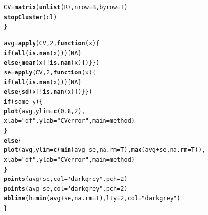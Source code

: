 \documentclass[11pt]{article}\usepackage[]{graphicx}\usepackage[]{color}
\makeatletter
\newcommand{\hlnum}[1]{\textcolor[rgb]{0.686,0.059,0.569}{#1}}%
\newcommand{\hlstr}[1]{\textcolor[rgb]{0.192,0.494,0.8}{#1}}%
\newcommand{\hlopt}[1]{\textcolor[rgb]{0,0,0}{#1}}%
\newcommand{\hlstd}[1]{\textcolor[rgb]{0.345,0.345,0.345}{#1}}%
\newcommand{\hlkwa}[1]{\textcolor[rgb]{0.161,0.373,0.58}{\textbf{#1}}}%
\newcommand{\hlkwb}[1]{\textcolor[rgb]{0.69,0.353,0.396}{#1}}%
\newcommand{\hlkwc}[1]{\textcolor[rgb]{0.333,0.667,0.333}{#1}}%
\newcommand{\hlkwd}[1]{\textcolor[rgb]{0.737,0.353,0.396}{\textbf{#1}}}%
\newenvironment{kframe}{%
 \def\at@end@of@kframe{}%
 \ifinner\ifhmode%
  \def\at@end@of@kframe{\end{minipage}}%
  \begin{minipage}{\columnwidth}%
 \fi\fi%
 \def\FrameCommand##1{\hskip\@totalleftmargin \hskip-\fboxsep
 \colorbox{shadecolor}{##1}\hskip-\fboxsep
     \hskip-\linewidth \hskip-\@totalleftmargin \hskip\columnwidth}%
 \MakeFramed {\advance\hsize-\width
   \@totalleftmargin\z@ \linewidth\hsize
   \@setminipage}}%
 {\par\unskip\endMakeFramed%
 \at@end@of@kframe}
\newenvironment{knitrout}{}{} %
\makeatother
\begin{document}
\begin{knitrout}
\begin{kframe}
\begin{alltt}
    \hlstd{CV} \hlkwb{=} \hlkwd{matrix}\hlstd{(}\hlkwd{unlist}\hlstd{(R),} \hlkwc{nrow} \hlstd{= B,} \hlkwc{byrow} \hlstd{= T)}
    \hlkwd{stopCluster}\hlstd{(cl)}
  \hlstd{\}}

  \hlstd{avg} \hlkwb{=} \hlkwd{apply}\hlstd{(CV,}\hlnum{2}\hlstd{,}\hlkwa{function}\hlstd{(}\hlkwc{x}\hlstd{)\{}
    \hlkwa{if} \hlstd{(}\hlkwd{all}\hlstd{(}\hlkwd{is.nan}\hlstd{(x)))\{}\hlnum{NA}\hlstd{\}}
    \hlkwa{else}\hlstd{\{}\hlkwd{mean}\hlstd{(x[}\hlopt{!}\hlkwd{is.nan}\hlstd{(x)])\}\})}
  \hlstd{se} \hlkwb{=} \hlkwd{apply}\hlstd{(CV,}\hlnum{2}\hlstd{,}\hlkwa{function}\hlstd{(}\hlkwc{x}\hlstd{)\{}
    \hlkwa{if} \hlstd{(}\hlkwd{all}\hlstd{(}\hlkwd{is.nan}\hlstd{(x)))\{}\hlnum{NA}\hlstd{\}}
    \hlkwa{else}\hlstd{\{}\hlkwd{sd}\hlstd{(x[}\hlopt{!}\hlkwd{is.nan}\hlstd{(x)])\}\})}
  \hlkwa{if} \hlstd{(same_y)\{}
    \hlkwd{plot}\hlstd{(avg,}\hlkwc{ylim}\hlstd{=}\hlkwd{c}\hlstd{(}\hlnum{0.8}\hlstd{,}\hlnum{2}\hlstd{),}
         \hlkwc{xlab}\hlstd{=}\hlstr{"df"}\hlstd{,}\hlkwc{ylab}\hlstd{=}\hlstr{"CV error"}\hlstd{,}\hlkwc{main}\hlstd{=method)}
  \hlstd{\}}
  \hlkwa{else}\hlstd{\{}
    \hlkwd{plot}\hlstd{(avg,}\hlkwc{ylim}\hlstd{=}\hlkwd{c}\hlstd{(}\hlkwd{min}\hlstd{(avg}\hlopt{-}\hlstd{se,}\hlkwc{na.rm} \hlstd{= T),}\hlkwd{max}\hlstd{(avg}\hlopt{+}\hlstd{se,}\hlkwc{na.rm} \hlstd{= T)),}
         \hlkwc{xlab}\hlstd{=}\hlstr{"df"}\hlstd{,}\hlkwc{ylab}\hlstd{=}\hlstr{"CV error"}\hlstd{,}\hlkwc{main}\hlstd{=method)}
  \hlstd{\}}
  \hlkwd{points}\hlstd{(avg}\hlopt{+}\hlstd{se,}\hlkwc{col}\hlstd{=}\hlstr{"darkgrey"}\hlstd{,}\hlkwc{pch}\hlstd{=}\hlnum{2}\hlstd{)}
  \hlkwd{points}\hlstd{(avg}\hlopt{-}\hlstd{se,}\hlkwc{col}\hlstd{=}\hlstr{"darkgrey"}\hlstd{,}\hlkwc{pch}\hlstd{=}\hlnum{2}\hlstd{)}
  \hlkwd{abline}\hlstd{(}\hlkwc{h} \hlstd{=} \hlkwd{min}\hlstd{(avg}\hlopt{+}\hlstd{se,}\hlkwc{na.rm} \hlstd{= T),} \hlkwc{lty} \hlstd{=} \hlnum{2}\hlstd{,} \hlkwc{col}\hlstd{=}\hlstr{"darkgrey"}\hlstd{)}
\hlstd{\}}
\end{alltt}
\end{kframe}
\end{knitrout}
\end{document}
